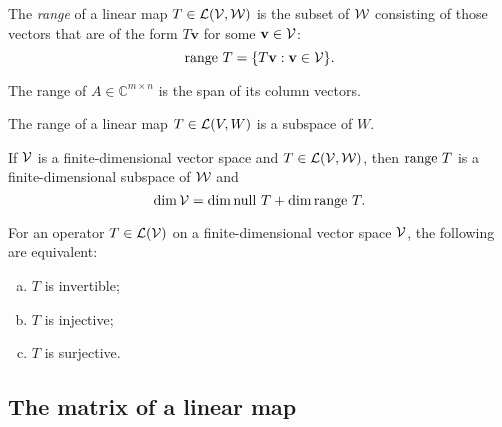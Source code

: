 \begin{defn}
  \label{def:range}
  The \emph{range} of a linear map
  \mbox{$T\in {\cal L}({\cal V}, {\cal W})$}
  is the subset of ${\cal W}$ consisting of those vectors
  that are of the form $T\mathbf{v}$ for some $\mathbf{v}\in{\cal V}$:
  \begin{equation}
    \label{eq:range}
    \mathrm{range}\ T = \{T\mathbf{v}: \mathbf{v}\in {\cal V}\}.
  \end{equation}
\end{defn}

\begin{exm}
  The range of $A\in \mathbb{C}^{m\times n}$
  is the span of its column vectors.
\end{exm}

\begin{thm}
  \label{thm:RangeIsAsubspace}
  The range of a linear map $T\in {\cal L}(V,W)$
  is a subspace of $W$.
\end{thm}

\begin{thm}
  \label{thm:dimensionsOfNullAndRange}
  If ${\cal V}$ is a finite-dimensional vector space
  and $T\in {\cal L}({\cal V}, {\cal W})$,
  then $\mathrm{range}\ T$ is a finite-dimensional subspace of ${\cal W}$
  and
  \begin{equation}
    \label{eq:dimensionsOfNullAndRange}
    \dim {\cal V} = \dim \mathrm{null}\ T + \dim \mathrm{range}\ T.
  \end{equation}
\end{thm}

\begin{thm}
  \label{thm:finiteDimVecSpaceInjecSurjecInvert}
  For an operator $T\in{\cal L}({\cal V})$ on a finite-dimensional vector
  space ${\cal V}$,
  the following are equivalent:
  \begin{enumerate}[(a)]\itemsep0em
  \item $T$ is invertible;
  \item $T$ is injective;
  \item $T$ is surjective.
  \end{enumerate}
\end{thm}

\subsection{The matrix of a linear map}
\label{sec:matrices-linear-maps}

